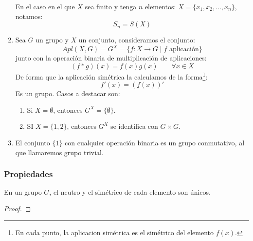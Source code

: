 \begin{ejemplo}
\begin{enumerate}
             En el caso en el que $X$ sea finito y tenga $n$ elementos: $X = \{x_1, x_2, \ldots, x_n\}$, notamos:
             \begin{equation*}
                 S_n = S(X)
             \end{equation*}
         \item Sea $G$ un grupo y $X$ un conjunto, consideramos el conjunto:
             \begin{equation*}
                 Apl(X,G) = G^X = \{f:X\rightarrow G \mid f \text{\ aplicación}\}
             \end{equation*}
             junto con la operación binaria de multiplicación de aplicaciones:
             \begin{equation*}
                 (f\ast g)(x) = f(x)g(x) \qquad \forall x\in X
             \end{equation*}
             De forma que la aplicación simétrica la calculamos de la forma\footnote{En cada punto, la aplicacion simétrica es el simétrico del elemento $f(x)$.}:
             \begin{equation*}
                 f'(x) = {(f(x))}'
             \end{equation*}
             Es un grupo. Casos a destacar son:
             \begin{enumerate}
                 \item Si $X=\emptyset $, entonces $G^X = \{\emptyset \}$.
                 \item SI $X = \{1,2\}$, entonces $G^X$ se identifica con $G\times G$.
             \end{enumerate}
         \item El conjunto $\{1\}$ con cualquier operación binaria es un grupo conmutativo, al que llamaremos grupo trivial.
     \end{enumerate}
\end{ejemplo}

\subsubsection{Propiedades}

\begin{prop}
    En un grupo $G$, el neutro y el simétrico de cada elemento son únicos.
    \begin{proof}
    \end{proof}
\end{prop}

